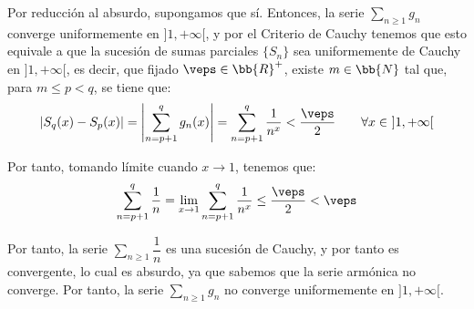 \begin{ejercicio}
\begin{enumerate}
        Por reducción al absurdo, supongamos que sí.
        Entonces, la serie $\sum\limits_{n\geq 1}g_n$ converge uniformemente en $]1, +\infty[$, y por el Criterio de Cauchy tenemos que
        esto equivale a que la sucesión de sumas parciales $\{S_n\}$ sea uniformemente de Cauchy en $]1, +\infty[$, es decir, que fijado
        $\veps\in \bb{R}^+$, existe $m\in \bb{N}$ tal que, para $m\leq p < q$, se tiene que:
        \begin{equation*}
            |S_q(x) - S_p(x)| = \left|\sum_{n=p+1}^q g_n(x)\right| = \sum_{n=p+1}^q \frac{1}{n^x} < \frac{\veps}{2} \qquad \forall x\in~]1, +\infty[
        \end{equation*}

        Por tanto, tomando límite cuando $x\to 1$, tenemos que:
        \begin{equation*}
            \sum_{n=p+1}^q \frac{1}{n} = \lim_{x\to 1}\sum_{n=p+1}^q \frac{1}{n^x} \leq \frac{\veps}{2} < \veps
        \end{equation*}

        Por tanto, la serie $\sum\limits_{n\geq 1}\dfrac{1}{n}$ es una sucesión de Cauchy, y por tanto es convergente, lo cual es absurdo, ya que sabemos que
        la serie armónica no converge. Por tanto, la serie $\sum\limits_{n\geq 1}g_n$ no converge uniformemente en $]1, +\infty[$.
    \end{enumerate}
\end{ejercicio}



